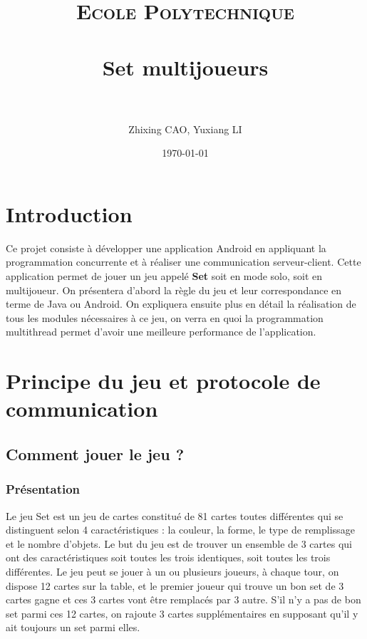 \documentclass[paper=a4, french]{scrartcl} %
\title{	
\normalfont \normalsize 
\textsc{Ecole Polytechnique} \\ [25pt] %
\horrule{0.5pt} \\[0.5cm] %
\huge Set multijoueurs \\ %
\horrule{2pt} \\[0.5cm] %
}
\author{Zhixing CAO, Yuxiang LI} %
\date{\normalsize\today} %
\begin{document}
\setlength\parindent{12pt}

\maketitle %



\section{Introduction}

Ce projet consiste à développer une application Android en appliquant la programmation concurrente et à réaliser une communication serveur-client. Cette application permet de jouer un jeu appelé \textbf{Set} soit en mode solo, soit en multijoueur. On présentera d'abord la règle du jeu et leur correspondance en terme de Java ou Android. On expliquera ensuite plus en détail la réalisation de tous les modules nécessaires à ce jeu, on verra en quoi la programmation multithread permet d'avoir une meilleure performance de l'application.


\section{Principe du jeu et protocole de communication }

\subsection{Comment jouer le jeu ?}

\subsubsection{Présentation}
Le jeu Set est un jeu de cartes constitué de 81 cartes toutes différentes qui se distinguent selon 4 caractéristiques : la couleur, la forme, le type de remplissage et le nombre d'objets. Le but du jeu est de trouver un ensemble de 3 cartes qui ont des caractéristiques soit toutes les trois identiques, soit toutes les trois différentes. Le jeu peut se jouer à un ou plusieurs joueurs, à chaque tour, on dispose 12 cartes sur la table, et le premier joueur qui trouve un bon set de 3 cartes gagne et ces 3 cartes vont être remplacés par 3 autre. S'il n'y a pas de bon set parmi ces 12 cartes, on rajoute 3 cartes supplémentaires en supposant qu'il y ait toujours un set parmi elles.
\end{document}
